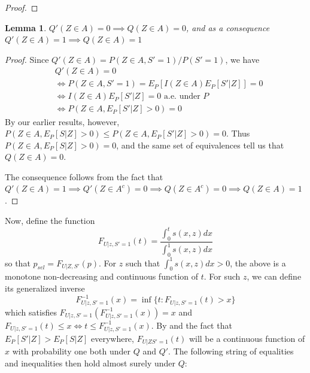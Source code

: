 \documentclass{article}
\newtheorem{lemma}{Lemma}
\begin{document}
\begin{appendix}
\begin{proof}
\end{proof}


\begin{lemma}
    \label{lem:switch}
    $Q'(Z \in A) = 0 \implies Q(Z \in A) = 0$, and as a consequence  $Q'(Z \in A) = 1 \implies Q(Z \in A) = 1$
\end{lemma}

\begin{proof} 
    Since $Q'(Z \in A) = P(Z \in A, S'=1)/P(S'=1)$, we have
    \begin{align*}
        &Q'(Z \in A) = 0 \\
        &\iff P(Z \in A, S'=1) = E_P[ I(Z \in A) E_P[ S' |Z]] = 0\\
        &\iff I(Z \in A) E_P[ S' |Z] = 0 \text{ a.e. under } P \\
        &\iff P(Z \in A, E_P[S'|Z]>0) = 0 
    \end{align*} 
    By our earlier results, however,  $P(Z \in A, E_P[S|Z]>0) \leq P(Z \in A, E_P[S'|Z]>0) = 0$. Thus  $P(Z \in A, E_P[S|Z]>0) =0$, and the same set of equivalences tell us that $Q(Z \in A) = 0$. 

    The consequence follows from the fact that $Q'(Z \in A) = 1 \implies Q'(Z \in A^c) = 0 \implies Q(Z \in A^c) = 0 \implies Q(Z \in A) = 1$. 
\end{proof}


Now, define the function 
\begin{equation*}
    F_{U|z, S'=1}(t) = \frac{\int_0^t s(x, z) dx }{\int_0^1 s(x, z) dx}
\end{equation*}
so that $p_{sel} = F_{U| Z, S'}(p)$. For $z$ such that $\int_0^1 s(x, z) dx > 0$, the above is a monotone non-decreasing and continuous function of $t$. For such $z$, we can define its generalized inverse
\begin{equation*}
    F^{-1}_{U |z, S'=1}(x)  = \inf \{t : F_{U |z, S' = 1}(t) > x  \}
\end{equation*}
which satisfies $F_{U|z, S' =1}(F^{-1}_{U |z, S'=1}(x)) = x$ and $F_{U | z, S' = 1}(t) \leq x \iff t \leq  F^{-1}_{U | z, S' = 1}(x)$. By  and the fact that $E_P[S' | Z] > E_P[S|Z]$ everywhere, $F_{U|Z S'=1}(t)$ will be a continuous function of $x$ with probability one both under $Q$ and $Q'$. The following string of equalities and inequalities then hold almost surely under $Q$:


\end{appendix}
\end{document}
